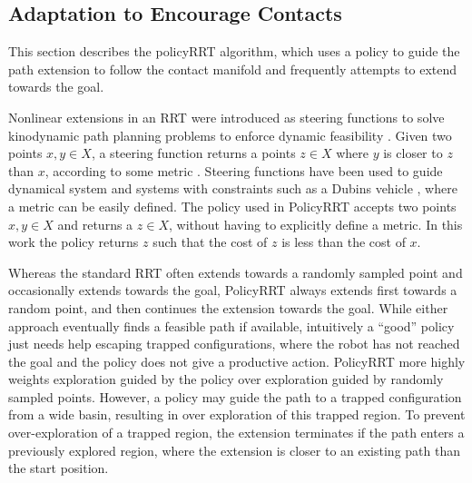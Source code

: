 \documentclass[../thesis.tex]{subfiles}
\begin{document}
\subsection{Adaptation to Encourage Contacts}
This section describes the policyRRT algorithm, which uses a policy to guide the path extension to follow the contact manifold and frequently attempts to extend towards the goal.

Nonlinear extensions in an RRT were introduced as steering functions to solve kinodynamic path planning problems to enforce dynamic feasibility \cite{lavalle2001randomized}.
Given two points $x,y \in X$, a steering function returns a points $z \in X$ where $y$ is closer to $z$ than $x$, according to some metric \cite{Karaman2011}.
Steering functions have been used to guide dynamical system and systems with constraints such as a Dubins vehicle \cite{karaman2011anytime}, where a metric can be easily defined.
The policy used in PolicyRRT accepts two points $x, y \in X$ and returns a $z \in X$, without having to explicitly define a metric.
In this work the policy returns $z$ such that the cost of $z$ is less than the cost of $x$.

Whereas the standard RRT often extends towards a randomly sampled point and occasionally extends towards the goal, PolicyRRT always extends first towards a random point, and then continues the extension towards the goal.
While either approach eventually finds a feasible path if available, intuitively a ``good'' policy just needs help escaping trapped configurations, where the robot has not reached the goal and the policy does not give a productive action.
PolicyRRT more highly weights exploration guided by the policy over exploration guided by randomly sampled points.
However, a policy may guide the path to a trapped configuration from a wide basin, resulting in over exploration of this trapped region.
To prevent over-exploration of a trapped region, the extension terminates if the path enters a previously explored region, where the extension is closer to an existing path than the start position.
\end{document}
